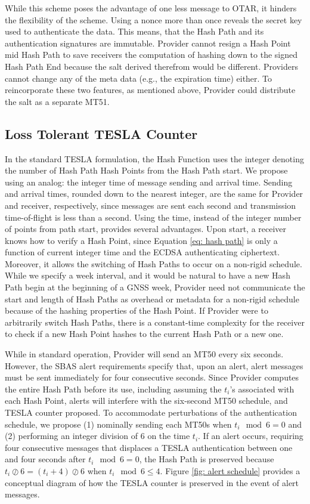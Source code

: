 \documentclass[letterpaper,times]{IONconf/IONconf}
\begin{document}
While this scheme poses the advantage of one less message to OTAR, it hinders the flexibility of the scheme.
Using a nonce more than once reveals the secret key used to authenticate the data.
This means, that the Hash Path and its authentication signatures are immutable.
Provider cannot resign a Hash Point mid Hash Path to save receivers the computation of hashing down to the signed Hash Path End because the salt derived therefrom would be different.
Providers cannot change any of the meta data (e.g., the expiration time) either.
To reincorporate these two features, as mentioned above, Provider could distribute the salt as a separate MT51.

\subsection{Loss Tolerant TESLA Counter} \label{sec: alert salt}

In the standard TESLA formulation, the Hash Function uses the integer denoting the number of Hash Path Hash Points from the Hash Path start.
We propose using an analog: the integer time of message sending and arrival time.
Sending and arrival times, rounded down to the nearest integer, are the same for Provider and receiver, respectively, since messages are sent each second and transmission time-of-flight is less than a second.
Using the time, instead of the integer number of points from path start, provides several advantages.
Upon start, a receiver knows how to verify a Hash Point, since Equation \eqref{eq: hash path} is only a function of current integer time and the ECDSA authenticating ciphertext.
Moreover, it allows the switching of Hash Paths to occur on a non-rigid schedule.
While we specify a week interval, and it would be natural to have a new Hash Path begin at the beginning of a GNSS week, Provider need not communicate the start and length of Hash Paths as overhead or metadata for a non-rigid schedule because of the hashing properties of the Hash Point.
If Provider were to arbitrarily switch Hash Paths, there is a constant-time complexity for the receiver to check if a new Hash Point hashes to the current Hash Path or a new one.

While in standard operation, Provider will send an MT50 every six seconds.
However, the SBAS alert requirements specify that, upon an alert, alert messages must be sent immediately for four consecutive seconds.
Since Provider computes the entire Hash Path before its use, including assuming the $t_i$'s associated with each Hash Point, alerts will interfere with the six-second MT50 schedule, and TESLA counter proposed.
To accommodate perturbations of the authentication schedule, we propose (1) nominally sending each MT50s when $t_i \mod 6 = 0$ and (2) performing an integer division of 6 on the time $t_i$.
If an alert occurs, requiring four consecutive messages that displaces a TESLA authentication between one and four seconds after $t_i \mod 6 = 0$, the Hash Path is preserved because $t_i \oslash 6 = (t_i + 4) \oslash 6$ when $t_i \mod 6 \leq 4 $.
Figure \ref{fig: alert schedule} provides a conceptual diagram of how the TESLA counter is preserved in the event of alert messages.
\end{document}
